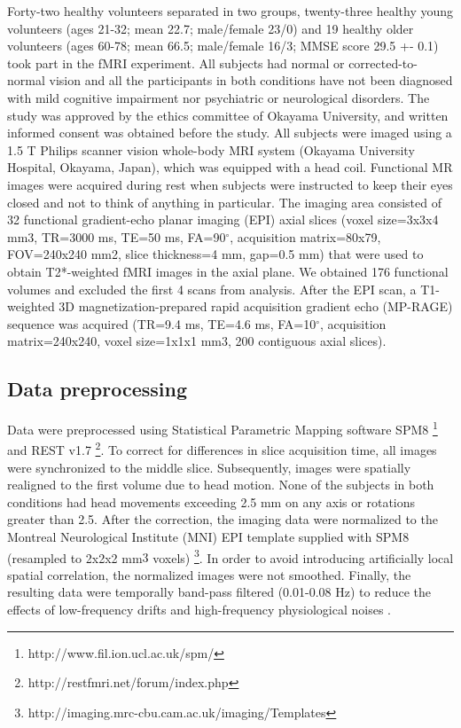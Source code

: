 \documentclass[12pt,a4paper]{article}
\begin{document}
Forty-two healthy volunteers separated in two groups, twenty-three healthy young volunteers (ages 21-32; mean 22.7; male/female 23/0) and 19 healthy older volunteers (ages 60-78; mean 66.5; male/female 16/3; MMSE score 29.5 +- 0.1) took part in the fMRI experiment. All subjects had
normal or corrected-to-normal vision and all the participants in both conditions have not been diagnosed with mild cognitive impairment nor psychiatric or neurological disorders. 
The study was approved by the ethics
committee of Okayama University, and written informed consent was obtained before the study. All subjects were imaged using a 1.5 T Philips scanner vision whole-body MRI system (Okayama University Hospital, Okayama, Japan), which was equipped with a head coil. Functional MR images were acquired during rest when subjects were
 instructed to keep their eyes closed and not to think of anything in
 particular. The imaging area consisted of 32 functional gradient-echo planar
 imaging (EPI) axial slices (voxel size=3x3x4 mm3, TR=3000 ms, TE=50 ms,
 FA=90$^\circ$, acquisition matrix=80x79, FOV=240x240 mm2, slice thickness=4 mm, gap=0.5 mm) that were used to obtain T2*-weighted fMRI images in the
 axial plane. We obtained 176 functional volumes and excluded the first 4 scans
 from analysis. After the EPI scan, a T1-weighted 3D magnetization-prepared
 rapid acquisition gradient echo (MP-RAGE) sequence was acquired (TR=9.4 ms, TE=4.6 ms, FA=10$^\circ$, acquisition matrix=240x240, voxel size=1x1x1 mm3, 200 contiguous axial slices).

\subsection{Data preprocessing} 
Data were preprocessed using Statistical Parametric Mapping software SPM8
\footnote{http://www.fil.ion.ucl.ac.uk/spm/} and REST v1.7
\footnote{http://restfmri.net/forum/index.php}. To correct for differences in
slice acquisition time, all images were synchronized to the middle slice.
Subsequently, images were spatially realigned to the first volume due to head
motion. None of the subjects in both conditions had head movements exceeding 2.5 mm on any axis or
rotations greater than 2.5\textdegree. After the correction,  the imaging data were
normalized to the Montreal Neurological Institute (MNI) EPI template supplied
with SPM8 (resampled to 2x2x2 mm$3$ voxels) \footnote{http://imaging.mrc-cbu.cam.ac.uk/imaging/Templates}. In order to avoid introducing artificially local spatial correlation, the normalized images were
not smoothed. Finally, the resulting data were temporally band-pass filtered
(0.01-0.08 Hz) to reduce the effects of low-frequency drifts and high-frequency
physiological noises \cite{jiao_granger_2011}.
\end{document}
